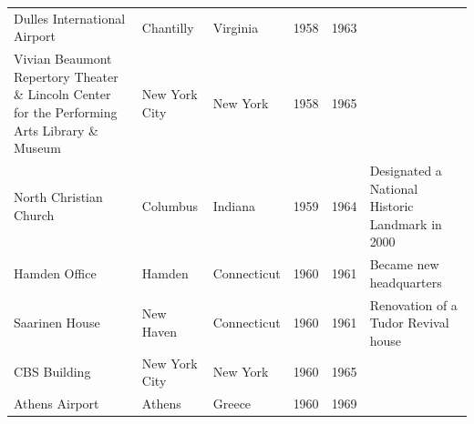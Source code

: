 \documentclass{article}
\begin{document}
\begin{tabular}{llllll}
Dulles International Airport & Chantilly & Virginia & 1958 & 1963 &  \\
Vivian Beaumont Repertory Theater \& Lincoln Center for the Performing Arts Library \& Museum & New York City & New York & 1958 & 1965 &  \\
North Christian Church & Columbus & Indiana & 1959 & 1964 & Designated a National Historic Landmark in 2000 \\
Hamden Office & Hamden & Connecticut & 1960 & 1961 & Became new headquarters \\
Saarinen House & New Haven & Connecticut & 1960 & 1961 & Renovation of a Tudor Revival house \\
CBS Building & New York City & New York & 1960 & 1965 &  \\
Athens Airport & Athens & Greece & 1960 & 1969 &  \\
\bottomrule
\end{tabular}
\end{document}

